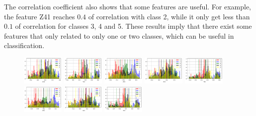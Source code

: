 \documentclass[11pt]{article}
\begin{document}
The correlation coefficient also shows that some features are useful. For example, the feature Z41 reaches $0.4$ of correlation with class 2, while it only get less than $0.1$ of correlation for classes 3, 4 and 5. These results imply that there exist some features that only related to only one or two classes, which can be useful in classification.

\begin{figure}[H]
  \centering
  \includegraphics[width=0.18\textwidth]{../code/Task2/Analysis/Hist-X01}
  \includegraphics[width=0.18\textwidth]{../code/Task2/Analysis/Hist-Y01}
  \includegraphics[width=0.18\textwidth]{../code/Task2/Analysis/Hist-Z01}
  \includegraphics[width=0.18\textwidth]{../code/Task2/Analysis/Hist-X11}
  \includegraphics[width=0.18\textwidth]{../code/Task2/Analysis/Hist-Y11} \\
  \includegraphics[width=0.18\textwidth]{../code/Task2/Analysis/Hist-Z11}
  \includegraphics[width=0.18\textwidth]{../code/Task2/Analysis/Hist-X21}
  \includegraphics[width=0.18\textwidth]{../code/Task2/Analysis/Hist-Y21}

\end{figure}
\end{document}
